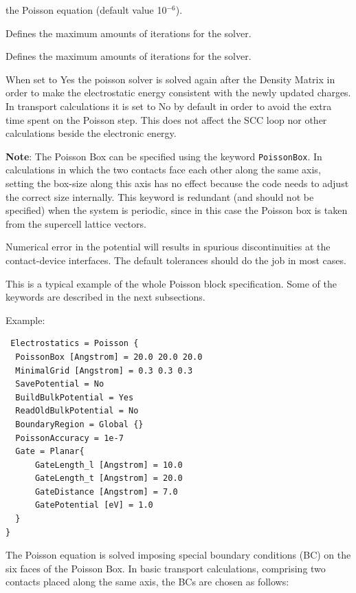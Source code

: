 \begin{description}
  the Poisson equation (default value 10$^{-6}$).
\item[\is{MaxPoissonIterations}] Defines the maximum amounts of iterations for
  the solver.
\item[\is{MaxPoissonIterations}] Defines the maximum amounts of iterations for
  the solver.
\item[\is{RecomputeAfterDensity}] When set to Yes the poisson solver is solved
  again after the Density Matrix in order to make the electrostatic energy 
  consistent with the newly updated charges. 
  In transport calculations it is set to No by default in order to avoid 
  the extra time spent on the Poisson step. This does not affect the SCC loop
  nor other calculations beside the electronic energy.
\end{description}

{\bf Note}: The Poisson Box can be specified using the keyword
\verb|PoissonBox|. In calculations in which the two contacts face each other
along the same axis, setting the box-size along this axis has no effect because
the code needs to adjust the correct size internally.  This keyword is redundant
(and should not be specified) when the system is periodic, since in this case
the Poisson box is taken from the supercell lattice vectors.

Numerical error in the potential will results in spurious discontinuities at the
contact-device interfaces. The default tolerances should do the job in most
cases.

This is a typical example of the whole Poisson block specification. Some of the
keywords are described in the next subsections.

Example:

\begin{verbatim}
 Electrostatics = Poisson {
  PoissonBox [Angstrom] = 20.0 20.0 20.0
  MinimalGrid [Angstrom] = 0.3 0.3 0.3
  SavePotential = No
  BuildBulkPotential = Yes
  ReadOldBulkPotential = No
  BoundaryRegion = Global {}
  PoissonAccuracy = 1e-7
  Gate = Planar{
      GateLength_l [Angstrom] = 10.0
      GateLength_t [Angstrom] = 20.0
      GateDistance [Angstrom] = 7.0
      GatePotential [eV] = 1.0
  }
}
\end{verbatim}


The Poisson equation is solved imposing special boundary conditions (BC) on the
six faces of the Poisson Box. In basic transport calculations, comprising two
contacts placed along the same axis, the BCs are chosen as follows:

